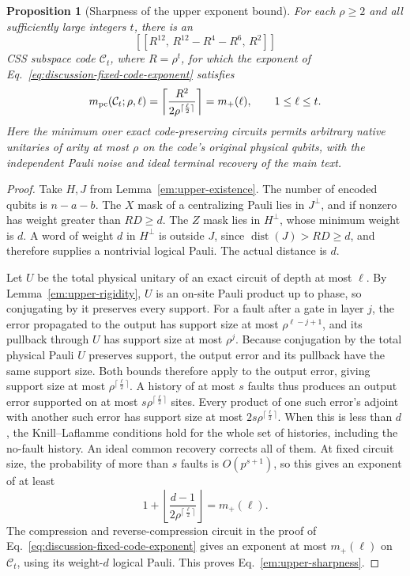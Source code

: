 \documentclass[aps,prl,reprint,notitlepage,nofootinbib,nobibnotes]{revtex4-2}
\newtheorem{proposition}{Proposition}
\begin{document}
\begin{proposition}[Sharpness of the upper exponent bound]
\label{prop:upper-saturation}
For each $\rho\ge2$ and all sufficiently large integers $t$, there is an
\[
 [[R^{12},\,R^{12}-R^4-R^6,\,R^2]]
\]
CSS subspace code $\mathcal C_t$, where $R=\rho^t$, for which the exponent of
Eq.~\eqref{eq:discussion-fixed-code-exponent} satisfies
\begin{equation}\label{em:upper-sharpness}
 m_{\rm pc}(\mathcal C_t;\rho,\ell)
 =\left\lceil\frac{R^2}{2\rho^{\lceil\frac{\ell}{2}\rceil}}\right\rceil
 =m_+(\ell),\qquad 1\le\ell\le t .
\end{equation}
Here the minimum over exact code-preserving circuits permits arbitrary native unitaries of arity at
most $\rho$ on the code's original physical qubits, with the independent Pauli noise and ideal
terminal recovery of the main text.
\end{proposition}

\begin{proof}
Take $H,J$ from Lemma~\ref{em:upper-existence}. The number of encoded qubits is $n-a-b$. The $X$
mask of a centralizing Pauli lies in $J^\perp$, and if nonzero has weight greater than $RD\ge d$.
The $Z$ mask lies in $H^\perp$, whose minimum weight is $d$. A word of weight $d$ in $H^\perp$ is
outside $J$, since $\operatorname{dist}(J)>RD\ge d$, and therefore supplies a nontrivial logical
Pauli. The actual distance is $d$.

Let $U$ be the total physical unitary of an exact circuit of depth at most $\ell$. By
Lemma~\ref{em:upper-rigidity}, $U$ is an on-site Pauli product up to phase, so conjugating by it
preserves every support. For a fault after a gate in layer $j$, the error propagated to the output
has support size at most $\rho^{\ell-j+1}$, and its pullback through $U$ has support size at most
$\rho^j$. Because conjugation by the total physical Pauli $U$ preserves support, the output error
and its pullback have the same support size. Both bounds therefore apply to the output error,
giving support size at most $\rho^{\lceil\frac{\ell}{2}\rceil}$. A history of at most $s$ faults
thus produces an output error supported on at most $s\rho^{\lceil\frac{\ell}{2}\rceil}$ sites.
Every product of one such error's adjoint with another such error has support size at most
$2s\rho^{\lceil\frac{\ell}{2}\rceil}$. When this is less than $d$, the Knill--Laflamme conditions
hold for the whole set of histories, including the no-fault history. An ideal common recovery
corrects all of them. At fixed circuit size, the probability of more than $s$ faults is
$O(p^{s+1})$, so this gives an exponent of at least
\[
 1+\left\lfloor\frac{d-1}{2\rho^{\lceil\frac{\ell}{2}\rceil}}\right\rfloor
 =m_+(\ell).
\]
The compression and reverse-compression circuit in the proof of
Eq.~\eqref{eq:discussion-fixed-code-exponent} gives an exponent at most $m_+(\ell)$ on $\mathcal
C_t$, using its weight-$d$ logical Pauli. This proves Eq.~\eqref{em:upper-sharpness}.
\end{proof}
\end{document}
